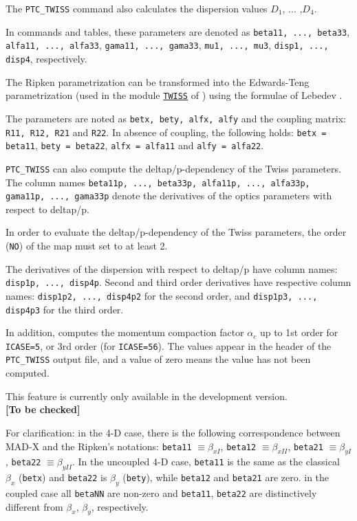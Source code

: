 The \texttt{PTC\_TWISS} command also calculates the dispersion values
$D_1$, ... ,$D_4$.

In \madx commands and tables, these parameters are denoted as
\texttt{beta11, ..., beta33}, \texttt{alfa11, ..., alfa33},
\texttt{gama11, ..., gama33}, \texttt{mu1, ..., mu3},
\texttt{disp1, ..., disp4}, respectively. 

The Ripken parametrization can be transformed into the Edwards-Teng
parametrization (used in the module
\hyperref[chap:twiss]{\texttt{TWISS}} of \madx) using the formulae of
Lebedev \cite{lebedev2010}. 

The parameters are noted as \texttt{betx, bety, alfx, alfy} and the
coupling matrix: \texttt{R11, R12, R21} and \texttt{R22}. In absence of
coupling, the following holds: \texttt{betx = beta11}, \texttt{bety = beta22},
\texttt{alfx = alfa11} and \texttt{alfy = alfa22}.

\texttt{PTC\_TWISS} can also compute the deltap/p-dependency of the Twiss
parameters. The column names \texttt{beta11p, ..., beta33p,
  alfa11p, ..., alfa33p, gama11p, ..., gama33p} denote the derivatives of
the optics parameters with respect to deltap/p. 

In order to evaluate the deltap/p-dependency of the Twiss parameters,
the order (\texttt{NO}) of the map must set to at least 2.  

The derivatives of the dispersion with respect to deltap/p have column
names: \texttt{disp1p, ..., disp4p}. 
Second and third order derivatives have respective column names:  
\texttt{disp1p2, ..., disp4p2} for the second order, and 
\texttt{disp1p3, ..., disp4p3} for the third order.

In addition, \ptc computes the momentum compaction factor $\alpha_c$ up to
1st order for \texttt{ICASE=5}, or 3rd order (for \texttt{ICASE=56}). The
values appear in the header of the \texttt{PTC\_TWISS} output file, and a
value of zero means the value has not been computed.

This feature is currently only available in the development
version. \\
\textbf{[To be checked]}

For clarification: in the 4-D case, there is the following
correspondence between MAD-X and the Ripken's notations:  
\texttt{beta11} $\equiv \beta_{xI}$, 
\texttt{beta12} $\equiv \beta_{xII}$, 
\texttt{beta21} $\equiv \beta_{yI}$, 
\texttt{beta22} $\equiv \beta_{yII}$.
In the uncoupled 4-D case, \texttt{beta11} is the same as the
classical $\beta_x$ (\texttt{betx}) and \texttt{beta22} is $\beta_y$ 
(\texttt{bety}), while \texttt{beta12} and \texttt{beta21} are zero.  
in the coupled case all \texttt{betaNN} are non-zero and \texttt{beta11},
\texttt{beta22} are distinctively different from $\beta_x$, $\beta_y$,
respectively.

